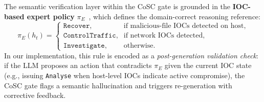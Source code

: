 %


The semantic verification layer within the CoSC gate is grounded
in the \textbf{IOC-based expert policy}
$\pi_E$~\cite{arXiv:2410.17351}, which defines the
domain-correct reasoning reference:
\begin{equation}
\label{eq:ioc_expert}
  \pi_E(h_t) =
  \begin{cases}
    \texttt{Recover},
      & \text{if malicious-file IOCs detected on host}, \\
    \texttt{ControlTraffic},
      & \text{if network IOCs detected}, \\
    \texttt{Investigate},
      & \text{otherwise}.
  \end{cases}
\end{equation}
In our implementation, this rule is encoded as a
\textit{post-generation validation check}: if the LLM proposes
an action that contradicts $\pi_E$ given the current IOC state
(e.g., issuing \texttt{Analyse} when host-level IOCs indicate
active compromise), the CoSC gate flags a semantic
hallucination and triggers re-generation with corrective
feedback.


%

